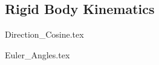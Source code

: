 \documentclass[class=report, 12pt, crop=false]{standalone}
\begin{document}
\begin{center}
\chapter{Rigid Body Kinematics}
\begin{comment}
\end{comment}
{Direction_Cosine.tex}
\begin{comment}
Start Level: Sections
End Level: Sections
Aditional Comments:

\end{comment}
{Euler_Angles.tex}
\begin{comment}
Start Level: Sections
End Level: Sections
Aditional Comments:

\end{comment}
\end{center}
\end{document}
